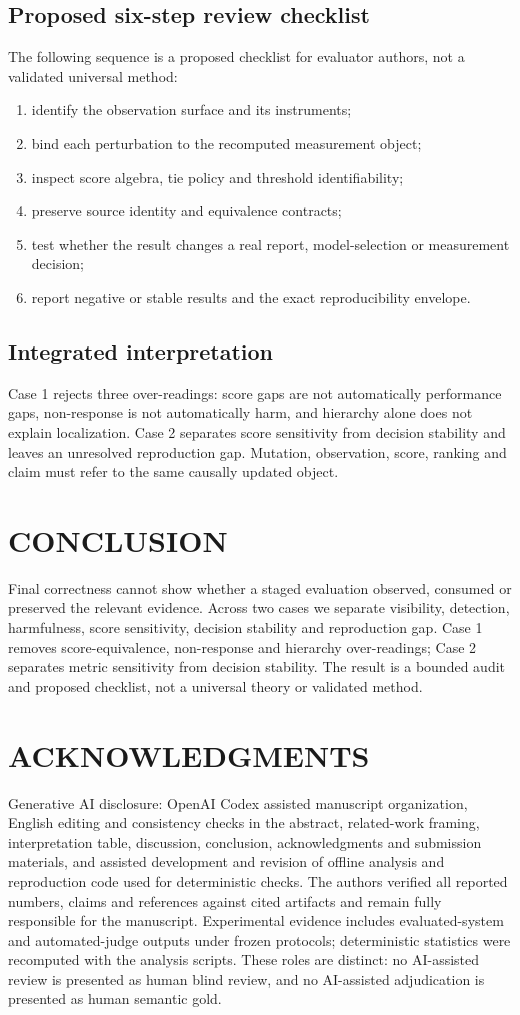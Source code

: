 \documentclass[a4paper,twoside]{article}
\begin{document}
\subsection{Proposed six-step review checklist}
The following sequence is a proposed checklist for evaluator authors, not a validated universal method:
\begin{enumerate}
\item identify the observation surface and its instruments;
\item bind each perturbation to the recomputed measurement object;
\item inspect score algebra, tie policy and threshold identifiability;
\item preserve source identity and equivalence contracts;
\item test whether the result changes a real report, model-selection or measurement decision;
\item report negative or stable results and the exact reproducibility envelope.
\end{enumerate}
\subsection{Integrated interpretation}
Case 1 rejects three over-readings: score gaps are not automatically performance gaps, non-response is not automatically harm, and hierarchy alone does not explain localization. Case 2 separates score sensitivity from decision stability and leaves an unresolved reproduction gap. Mutation, observation, score, ranking and claim must refer to the same causally updated object.
\section{\uppercase{Conclusion}}
Final correctness cannot show whether a staged evaluation observed, consumed or preserved the relevant evidence. Across two cases we separate visibility, detection, harmfulness, score sensitivity, decision stability and reproduction gap. Case 1 removes score-equivalence, non-response and hierarchy over-readings; Case 2 separates metric sensitivity from decision stability. The result is a bounded audit and proposed checklist, not a universal theory or validated method.
\section*{\uppercase{Acknowledgments}}
Generative AI disclosure: OpenAI Codex \cite{openai2026codex} assisted manuscript organization,
English editing and consistency checks in the abstract, related-work framing,
interpretation table, discussion, conclusion, acknowledgments and submission
materials, and assisted development and revision of offline analysis and
reproduction code used for deterministic checks. The authors verified all
reported numbers, claims and references against cited artifacts and remain
fully responsible for the manuscript. Experimental evidence includes
evaluated-system and automated-judge outputs under frozen protocols;
deterministic statistics were recomputed with the analysis scripts. These roles
are distinct: no AI-assisted review is presented as human blind review, and no
AI-assisted adjudication is presented as human semantic gold.
\end{document}
